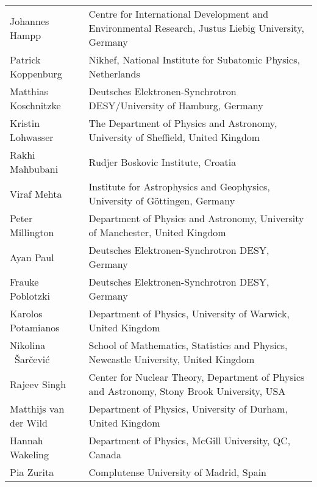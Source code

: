 \documentclass[../SustainableHEP.tex]{subfiles}
\begin{document}
\begin{longtable*}{@{}m{0.3\textwidth} p{0.7\textwidth}}
Johannes Hampp & Centre for International Development and Environmental Research, Justus Liebig University, Germany\\ %

Patrick Koppenburg & Nikhef, National Institute for Subatomic Physics, Netherlands\\ %

Matthias Koschnitzke & Deutsches Elektronen-Synchrotron DESY/University of Hamburg, Germany \\ %

Kristin Lohwasser & The Department of Physics and Astronomy, University of Sheffield, United Kingdom\\ %

Rakhi Mahbubani & Rudjer Boskovic Institute, Croatia\\

Viraf Mehta & Institute for Astrophysics and Geophysics, University of G\"ottingen, Germany\\

Peter Millington & Department of Physics and Astronomy, University of Manchester, United Kingdom\\ %

Ayan Paul & Deutsches Elektronen-Synchrotron DESY, Germany \\ %

Frauke Poblotzki & Deutsches Elektronen-Synchrotron DESY,  Germany \\ %

Karolos Potamianos & Department of Physics, University of Warwick, United Kingdom \\ %

Nikolina ~\v{S}ar\v{c}evi\'c &
School of Mathematics, Statistics and Physics, Newcastle University, United Kingdom \\ %

Rajeev Singh & Center for Nuclear Theory, Department of Physics and Astronomy, Stony Brook University, USA\\

Matthijs van der Wild & Department of Physics, University of Durham, United Kingdom\\

Hannah Wakeling & Department of Physics, McGill University, QC, Canada\\ %

Pia Zurita & Complutense University of Madrid, Spain

\end{longtable*}
\renewcommand{\arraystretch}{1}
\end{document}
